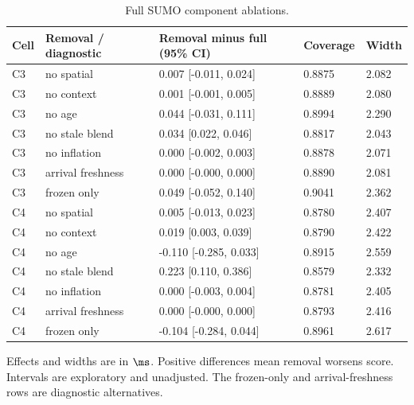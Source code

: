 \begin{table}[p]
\caption{Full SUMO component ablations.}\label{tab:ablation-sumo}
\centering\small
\begin{tabular}{lllll}\toprule
Cell & Removal / diagnostic & Removal minus full (95\% CI) & Coverage & Width \\\midrule
C3 & no spatial & 0.007 [-0.011, 0.024] & 0.8875 & 2.082 \\
C3 & no context & 0.001 [-0.001, 0.005] & 0.8889 & 2.080 \\
C3 & no age & 0.044 [-0.031, 0.111] & 0.8994 & 2.290 \\
C3 & no stale blend & 0.034 [0.022, 0.046] & 0.8817 & 2.043 \\
C3 & no inflation & 0.000 [-0.002, 0.003] & 0.8878 & 2.071 \\
C3 & arrival freshness & 0.000 [-0.000, 0.000] & 0.8890 & 2.081 \\
C3 & frozen only & 0.049 [-0.052, 0.140] & 0.9041 & 2.362 \\
C4 & no spatial & 0.005 [-0.013, 0.023] & 0.8780 & 2.407 \\
C4 & no context & 0.019 [0.003, 0.039] & 0.8790 & 2.422 \\
C4 & no age & -0.110 [-0.285, 0.033] & 0.8915 & 2.559 \\
C4 & no stale blend & 0.223 [0.110, 0.386] & 0.8579 & 2.332 \\
C4 & no inflation & 0.000 [-0.003, 0.004] & 0.8781 & 2.405 \\
C4 & arrival freshness & 0.000 [-0.000, 0.000] & 0.8793 & 2.416 \\
C4 & frozen only & -0.104 [-0.284, 0.044] & 0.8961 & 2.617 \\
\bottomrule\end{tabular}
\par\smallskip\footnotesize Effects and widths are in $\ms$. Positive differences mean removal worsens score. Intervals are exploratory and unadjusted. The frozen-only and arrival-freshness rows are diagnostic alternatives.
\end{table}\clearpage
